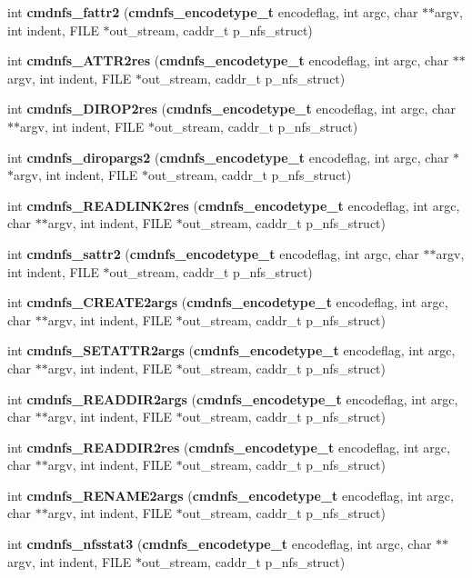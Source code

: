 \begin{CompactItemize}
int {\bf cmdnfs\_\-fattr2} ({\bf cmdnfs\_\-encodetype\_\-t} encodeflag, int argc, char $\ast$$\ast$argv, int indent, FILE $\ast$out\_\-stream, caddr\_\-t p\_\-nfs\_\-struct)
\item 
int {\bf cmdnfs\_\-ATTR2res} ({\bf cmdnfs\_\-encodetype\_\-t} encodeflag, int argc, char $\ast$$\ast$argv, int indent, FILE $\ast$out\_\-stream, caddr\_\-t p\_\-nfs\_\-struct)
\item 
int {\bf cmdnfs\_\-DIROP2res} ({\bf cmdnfs\_\-encodetype\_\-t} encodeflag, int argc, char $\ast$$\ast$argv, int indent, FILE $\ast$out\_\-stream, caddr\_\-t p\_\-nfs\_\-struct)
\item 
int {\bf cmdnfs\_\-diropargs2} ({\bf cmdnfs\_\-encodetype\_\-t} encodeflag, int argc, char $\ast$$\ast$argv, int indent, FILE $\ast$out\_\-stream, caddr\_\-t p\_\-nfs\_\-struct)
\item 
int {\bf cmdnfs\_\-READLINK2res} ({\bf cmdnfs\_\-encodetype\_\-t} encodeflag, int argc, char $\ast$$\ast$argv, int indent, FILE $\ast$out\_\-stream, caddr\_\-t p\_\-nfs\_\-struct)
\item 
int {\bf cmdnfs\_\-sattr2} ({\bf cmdnfs\_\-encodetype\_\-t} encodeflag, int argc, char $\ast$$\ast$argv, int indent, FILE $\ast$out\_\-stream, caddr\_\-t p\_\-nfs\_\-struct)
\item 
int {\bf cmdnfs\_\-CREATE2args} ({\bf cmdnfs\_\-encodetype\_\-t} encodeflag, int argc, char $\ast$$\ast$argv, int indent, FILE $\ast$out\_\-stream, caddr\_\-t p\_\-nfs\_\-struct)
\item 
int {\bf cmdnfs\_\-SETATTR2args} ({\bf cmdnfs\_\-encodetype\_\-t} encodeflag, int argc, char $\ast$$\ast$argv, int indent, FILE $\ast$out\_\-stream, caddr\_\-t p\_\-nfs\_\-struct)
\item 
int {\bf cmdnfs\_\-READDIR2args} ({\bf cmdnfs\_\-encodetype\_\-t} encodeflag, int argc, char $\ast$$\ast$argv, int indent, FILE $\ast$out\_\-stream, caddr\_\-t p\_\-nfs\_\-struct)
\item 
int {\bf cmdnfs\_\-READDIR2res} ({\bf cmdnfs\_\-encodetype\_\-t} encodeflag, int argc, char $\ast$$\ast$argv, int indent, FILE $\ast$out\_\-stream, caddr\_\-t p\_\-nfs\_\-struct)
\item 
int {\bf cmdnfs\_\-RENAME2args} ({\bf cmdnfs\_\-encodetype\_\-t} encodeflag, int argc, char $\ast$$\ast$argv, int indent, FILE $\ast$out\_\-stream, caddr\_\-t p\_\-nfs\_\-struct)
\item 
int {\bf cmdnfs\_\-nfsstat3} ({\bf cmdnfs\_\-encodetype\_\-t} encodeflag, int argc, char $\ast$$\ast$argv, int indent, FILE $\ast$out\_\-stream, caddr\_\-t p\_\-nfs\_\-struct)

\end{CompactItemize}
